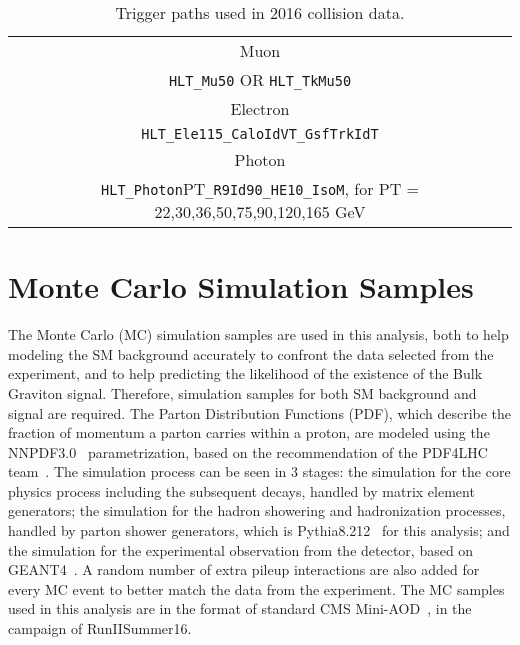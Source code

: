 \begin{table}[htbp!]
\begin{small}
   \caption{Trigger paths used in 2016 collision data.
   \label{tab:triggerPaths}}
   \centering
   \begin{tabular}{ c }
\hline\hline
Muon  \\ \texttt{HLT\_Mu50} OR \texttt{HLT\_TkMu50}  \\ \hline
Electron \\ \texttt{HLT\_Ele115\_CaloIdVT\_GsfTrkIdT} \\ \hline
Photon \\ \texttt{HLT\_Photon}PT\texttt{\_R9Id90\_HE10\_IsoM},  for PT = 22,30,36,50,75,90,120,165 GeV \\  
\hline
\hline
    \end{tabular}
\end{small}
\end{table}


\section{Monte Carlo Simulation Samples}
The Monte Carlo (MC) simulation samples are used in this analysis, both to help modeling the SM background accurately to confront the data selected from the experiment, and to help predicting the likelihood of the existence of the Bulk Graviton signal. Therefore, simulation samples for both SM background and signal are required. The Parton Distribution Functions (PDF), which describe the fraction of momentum a parton carries within a proton, are modeled using the NNPDF3.0~\cite{sample_nnpdf30} parametrization, based on the recommendation of the PDF4LHC team~\cite{sample_pdf4lhc}. The simulation process can be seen in 3 stages: the simulation for the core physics process including the subsequent decays, handled by matrix element generators; the simulation for the hadron showering and hadronization processes, handled by parton shower generators, which is Pythia8.212~\cite{sample_pythia} for this analysis; and the simulation for the experimental observation from the detector, based on GEANT4~\cite{sample_geant4}. A random number of extra pileup interactions are also added for every MC event to better match the data from the experiment. The MC samples used in this analysis are in the format of standard CMS Mini-AOD~\cite{sample_miniaod}, in the campaign of RunIISummer16.


